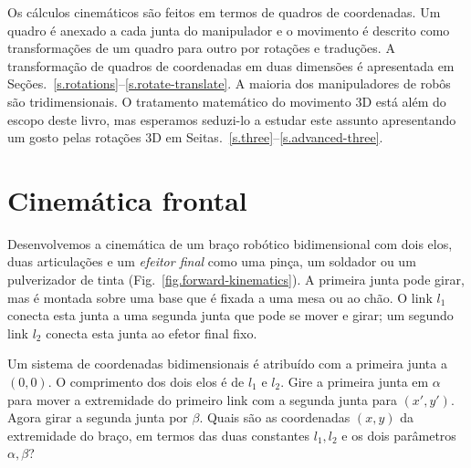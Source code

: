 Os cálculos cinemáticos são feitos em termos de quadros de coordenadas. Um quadro é anexado a cada junta do manipulador e o movimento é descrito como transformações de um quadro para outro por rotações e traduções. A transformação de quadros de coordenadas em duas dimensões é apresentada em Seções.~\ref{s.rotations}--\ref{s.rotate-translate}. A maioria dos manipuladores de robôs são tridimensionais. O tratamento matemático do movimento 3D está além do escopo deste livro, mas esperamos seduzi-lo a estudar este assunto apresentando um gosto pelas rotações 3D em Seitas.~\ref{s.three}--\ref{s.advanced-three}.


\section{Cinemática frontal}\label{s.forward-kinematics}

Desenvolvemos a cinemática de um braço robótico bidimensional com dois elos, duas articulações e um \emph{efeitor final} como uma pinça, um soldador ou um pulverizador de tinta (Fig.~\ref{fig.forward-kinematics}). A primeira junta pode girar, mas é montada sobre uma base que é fixada a uma mesa ou ao chão. O link $l_1$ conecta esta junta a uma segunda junta que pode se mover e girar; um segundo link $l_2$ conecta esta junta ao efetor final fixo.

Um sistema de coordenadas bidimensionais é atribuído com a primeira junta a $(0,0)$. O comprimento dos dois elos é de $l_1$ e $l_2$. Gire a primeira junta em $\alpha$ para mover a extremidade do primeiro link com a segunda junta para $(x',y')$. Agora girar a segunda junta por $\beta$. Quais são as coordenadas $(x,y)$ da extremidade do braço, em termos das duas constantes $l_1,l_2$ e os dois parâmetros $\alpha,\beta$?

